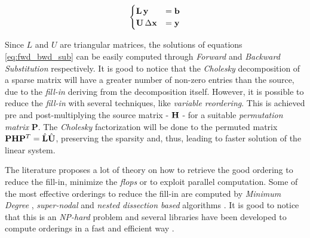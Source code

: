 \begin{equation}
    \label{eq:fwd_bwd_sub}
    \begin{cases}
        \mathbf{L}\,\mathbf{y} &= \mathbf{b} \\
        \mathbf{U}\,\Delta \mathbf{x} &= \mathbf{y}
    \end{cases}
\end{equation}

\noindent Since $L$ and $U$ are triangular matrices, the solutions of equations \ref{eq:fwd_bwd_sub} can be easily computed through \textit{Forward} and \textit{Backward Substitution} respectively. It is good to notice that the \textit{Cholesky} decomposition of a sparse matrix will have a greater number of non-zero entries than the source, due to the \textit{fill-in} deriving from the decomposition itself. However, it is possible to reduce the \textit{fill-in} with several techniques, like \textit{variable reordering}. This is achieved pre and post-multiplying the source matrix - $\mathbf{H}$ - for a suitable \textit{permutation matrix} $\mathbf{P}$. The \textit{Cholesky} factorization will be done to the permuted matrix $\mathbf{P}\mathbf{H} \mathbf{P}^T = \hat{\mathbf{L}}\hat{\mathbf{U}}$, preserving the sparsity and, thus, leading to faster solution of the linear system. 

The literature proposes a lot of theory on how to retrieve the good ordering to reduce the fill-in, minimize the \textit{flops} or to exploit parallel computation. Some of the most effective orderings to reduce the fill-in are computed by \textit{Minimum Degree} \cite{amestoy1996amd, davis2004colamd}, \textit{super-nodal} \cite{cleveland1987supernodal} and \textit{nested dissection based} algorithms \cite{karypis1998metis}. It is good to notice that this is an \textit{NP-hard} problem and several libraries have been developed to compute orderings in a fast and efficient way \cite{agarwal2012variable}.

